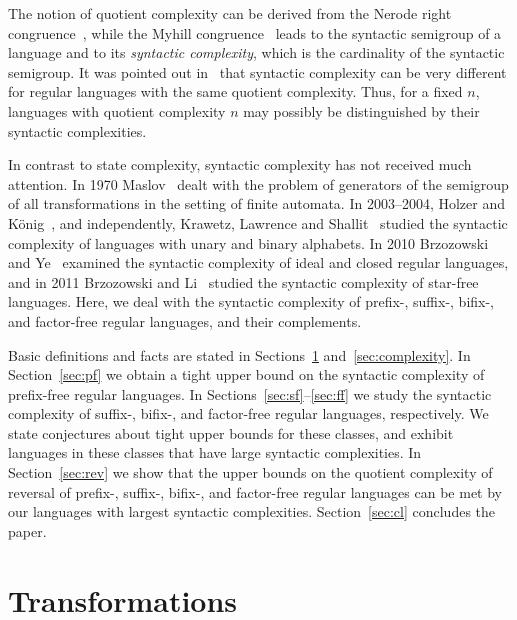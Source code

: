 \documentclass{llncs}
\begin{document}
The notion of quotient complexity can be derived from the Nerode right congruence~\cite{Ner58}, 
while the Myhill congruence~\cite{Myh57} leads to the syntactic semigroup of a language and to its \emph{syntactic complexity}, which is the cardinality of the syntactic semigroup.
It was pointed out in~\cite{BrYe11} that syntactic complexity can be very different for regular languages with the same quotient complexity.
Thus, for a fixed $n$, languages with quotient complexity $n$ may possibly be distinguished by their syntactic complexities.

In contrast to state complexity, syntactic complexity has not received much attention. In 1970 Maslov~\cite{Mas70} dealt with the problem of generators of the semigroup of all transformations in the setting of finite automata. In 2003--2004, Holzer and K\"onig~\cite{HoKo04}, and independently, Krawetz, Lawrence and Shallit~\cite{KLS03} studied the syntactic complexity of languages with unary and binary alphabets. 
In 2010 Brzozowski and Ye~\cite{BrYe11} examined the syntactic complexity of ideal and closed regular languages, and in 2011 Brzozowski and Li~\cite{BL11} studied the syntactic complexity of star-free languages. 
Here, we deal with the syntactic complexity of  prefix-, suffix-, bifix-, and factor-free regular languages, and their complements.

Basic definitions and facts are stated in Sections~\ref{sec:trans} and~\ref{sec:complexity}. In Section~\ref{sec:pf} we obtain a tight upper bound on the syntactic complexity of prefix-free regular languages. In Sections~\ref{sec:sf}--\ref{sec:ff} we study the syntactic complexity of suffix-, bifix-, and factor-free regular languages, respectively.  We state conjectures about tight upper bounds for these classes, and exhibit languages in these classes that have large syntactic complexities.   In Section~\ref{sec:rev} we show that the upper bounds on the quotient complexity of reversal of prefix-, suffix-, bifix-, and factor-free regular languages can be met by our languages with largest syntactic complexities. Section~\ref{sec:cl} concludes the paper.


\section{Transformations}\label{sec:trans}
\end{document}
